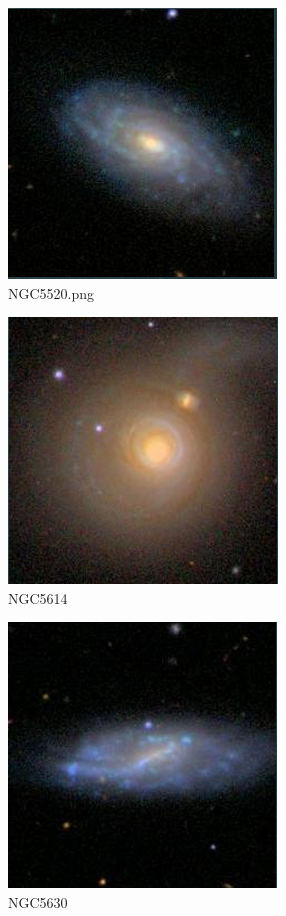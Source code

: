 \documentclass[9pt]{revtex4-1}
\begin{document}
\begin{figure}
\includegraphics[scale=0.3]{NGC5520.png}
\caption{NGC5520.png}
\end{figure}
\begin{figure}
\includegraphics[scale=0.3]{NGC5614.png}
\caption{NGC5614}
\end{figure}
\begin{figure}
\includegraphics[scale=0.3]{NGC5630.png}
\caption{NGC5630}
\end{figure}
\end{document}
